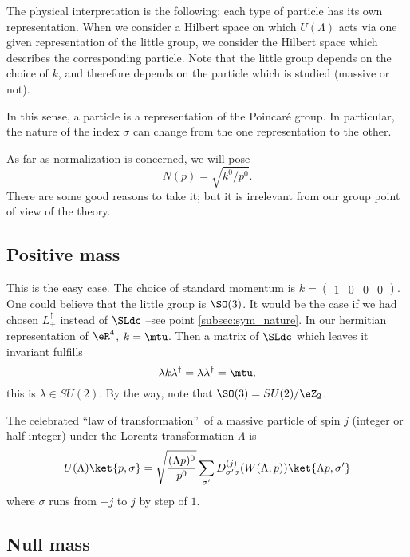 The physical interpretation is the following\label{pg:phyz_reprez}: each type of particle has its own representation. When we consider a Hilbert space on which $U(\Lambda)$ acts via one given representation of the little group, we consider the Hilbert space which describes the corresponding particle. Note that the little group depends on the choice of $k$, and therefore depends on the particle which is studied (massive or not).

In this sense, a particle is a representation of the Poincaré group. In particular, the nature of the index $\sigma$ can change from the one representation to the other.

\begin{remark}
As far as normalization is concerned, we will pose
\[
  N(p)=\sqrt{k^0/p^0}.
\]
There are some good reasons to take it; but it is irrelevant from our group point of view of the theory.
\end{remark}

\subsection{Positive mass}

This is the easy case. The choice of standard momentum is $k=\begin{pmatrix}1&0&0&0\end{pmatrix}$. One could believe that the little group is $\SO(3)$. It would be the case if we had chosen $L_+^{\uparrow}$ instead of $\SLdc$ --see point \ref{subsec:sym_nature}. In our hermitian representation of $\eR^4$, $k=\mtu$. Then a matrix of $\SLdc$ which leaves it invariant fulfills
\[
   \lambda k\lambda^{\dag}=\lambda\lambda^{\dag}=\mtu,
\]
this is $\lambda\in SU(2)$. By the way, note that $\SO(3)=SU(2)/\eZ_2$.

The celebrated ``law of transformation''\ of a massive particle of spin $j$ (integer or half integer) under the Lorentz transformation $\Lambda$ is 
\begin{equation}
  U(\Lambda)\ket{p,\sigma}=\sqrt{\frac{ (\Lambda p)^0 }{p^0}}
       \sum_{\sigma'}D^{(j)}_{\sigma'\sigma}(W(\Lambda,p))\ket{\Lambda p,\sigma'}
\end{equation}
where $\sigma$ runs from $-j$ to $j$ by step of $1$.

\subsection{Null mass}

